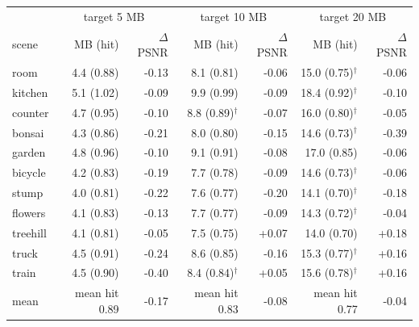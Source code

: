 \begin{tabular}{lrrrrrr}
\toprule
& \multicolumn{2}{c}{target 5 MB} & \multicolumn{2}{c}{target 10 MB} & \multicolumn{2}{c}{target 20 MB} \\
scene & MB (hit) & $\Delta$PSNR & MB (hit) & $\Delta$PSNR & MB (hit) & $\Delta$PSNR \\
\midrule
room & 4.4 (0.88) & -0.13 & 8.1 (0.81) & -0.06 & 15.0 (0.75)$^\dagger$ & -0.06 \\
kitchen & 5.1 (1.02) & -0.09 & 9.9 (0.99) & -0.09 & 18.4 (0.92)$^\dagger$ & -0.10 \\
counter & 4.7 (0.95) & -0.10 & 8.8 (0.89)$^\dagger$ & -0.07 & 16.0 (0.80)$^\dagger$ & -0.05 \\
bonsai & 4.3 (0.86) & -0.21 & 8.0 (0.80) & -0.15 & 14.6 (0.73)$^\dagger$ & -0.39 \\
garden & 4.8 (0.96) & -0.10 & 9.1 (0.91) & -0.08 & 17.0 (0.85) & -0.06 \\
bicycle & 4.2 (0.83) & -0.19 & 7.7 (0.78) & -0.09 & 14.6 (0.73)$^\dagger$ & -0.06 \\
stump & 4.0 (0.81) & -0.22 & 7.6 (0.77) & -0.20 & 14.1 (0.70)$^\dagger$ & -0.18 \\
flowers & 4.1 (0.83) & -0.13 & 7.7 (0.77) & -0.09 & 14.3 (0.72)$^\dagger$ & -0.04 \\
treehill & 4.1 (0.81) & -0.05 & 7.5 (0.75) & +0.07 & 14.0 (0.70) & +0.18 \\
truck & 4.5 (0.91) & -0.24 & 8.6 (0.85) & -0.16 & 15.3 (0.77)$^\dagger$ & +0.16 \\
train & 4.5 (0.90) & -0.40 & 8.4 (0.84)$^\dagger$ & +0.05 & 15.6 (0.78)$^\dagger$ & +0.16 \\
\midrule
mean & mean hit 0.89 & -0.17 & mean hit 0.83 & -0.08 & mean hit 0.77 & -0.04 \\
\bottomrule
\end{tabular}

